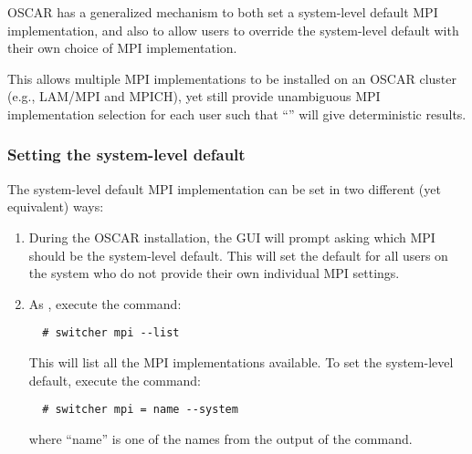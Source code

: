 %
%
%
%

OSCAR has a generalized mechanism to both set a system-level default
MPI implementation, and also to allow users to override the
system-level default with their own choice of MPI implementation.

This allows multiple MPI implementations to be installed on an OSCAR
cluster (e.g., LAM/MPI and MPICH), yet still provide unambiguous MPI
implementation selection for each user such that ``'' will give deterministic results.


\subsubsection{Setting the system-level default}

The system-level default MPI implementation can be set in two
different (yet equivalent) ways:

\begin{enumerate}
\item During the OSCAR installation, the GUI will prompt asking which
  MPI should be the system-level default.  This will set the default
  for all users on the system who do not provide their own individual
  MPI settings.
  
\item As , execute the command:

\begin{verbatim}
  # switcher mpi --list
\end{verbatim}

   This will list all the MPI implementations available.  To set the
   system-level default, execute the command:

\begin{verbatim}
  # switcher mpi = name --system
\end{verbatim}
   
   where ``name'' is one of the names from the output of the
    command.
\end{enumerate}

